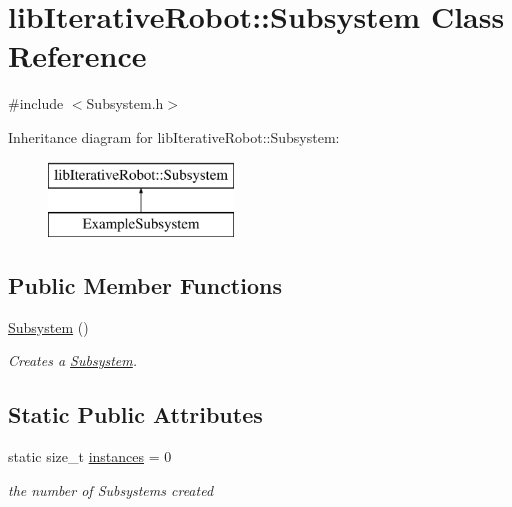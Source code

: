 \hypertarget{classlib_iterative_robot_1_1_subsystem}{}\section{lib\+Iterative\+Robot\+::Subsystem Class Reference}
\label{classlib_iterative_robot_1_1_subsystem}


{\ttfamily \#include $<$Subsystem.\+h$>$}

Inheritance diagram for lib\+Iterative\+Robot\+::Subsystem\+:\begin{figure}[H]
\begin{center}
\leavevmode
\includegraphics[height=2.000000cm]{classlib_iterative_robot_1_1_subsystem}
\end{center}
\end{figure}
\subsection*{Public Member Functions}
\begin{DoxyCompactItemize}
\item 
\mbox{\hyperlink{classlib_iterative_robot_1_1_subsystem_abdec44abe9ddba76f65abb02f8f62992}{Subsystem}} ()
\begin{DoxyCompactList}\small\item\em Creates a \mbox{\hyperlink{classlib_iterative_robot_1_1_subsystem}{Subsystem}}. \end{DoxyCompactList}\end{DoxyCompactItemize}
\subsection*{Static Public Attributes}
\begin{DoxyCompactItemize}
\item 
\mbox{\label{classlib_iterative_robot_1_1_subsystem_a8520e50bb977676222daa241e757ab33}} 
static size\+\_\+t \mbox{\hyperlink{classlib_iterative_robot_1_1_subsystem_a8520e50bb977676222daa241e757ab33}{instances}} = 0
\begin{DoxyCompactList}\small\item\em the number of Subsystems created \end{DoxyCompactList}\end{DoxyCompactItemize}
